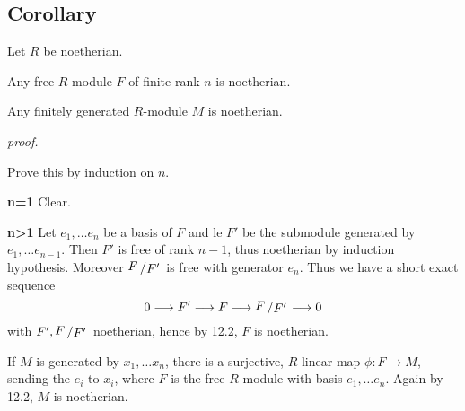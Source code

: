 \documentclass[12pt]{book}
\newcommand{\slant}[2]{{\raisebox{.1em}{$#1$}\left/\raisebox{-.1em}{$#2$}\right.}}
\begin{document}
\begin{spacing}{1.3}
\subsection{Corollary} %
Let $R$ be noetherian. 
\begin{compactenum}
\item Any free $R$-module $F$ of finite rank $n$ is noetherian.
\item Any finitely generated $R$-module $M$ is noetherian.
\end{compactenum}
\textit{proof.}
\begin{compactenum}
\item Prove this by induction on $n$. 
\begin{compactitem}
\item[\textbf{n=1}] Clear.
\item[\textbf{n>1}] Let $e_1, \ldots e_n$ be a basis of $F$ and le $F'$ be the submodule generated by $e_1, \ldots e_{n-1}$. Then $F'$ is free of rank $n-1$, thus noetherian by induction hypothesis. Moreover $\slant{F}{F'}$ is free with generator $e_n$. Thus we have a short exact sequence
$$0 \longrightarrow F' \longrightarrow F \longrightarrow \slant{F}{F'} \longrightarrow 0$$
with $F', \slant{F}{F'}$ noetherian, hence by 12.2, $F$ is noetherian.
\end{compactitem}
\item If $M$ is generated by $x_1, \ldots x_n$, there is a surjective, $R$-linear map $\phi: F \longrightarrow M$, sending the $e_i$ to $x_i$, where $F$ is the free $R$-module with basis $e_1, \ldots e_n$. Again by 12.2, $M$ is noetherian.
\end{compactenum}


\end{spacing}
\end{document}
